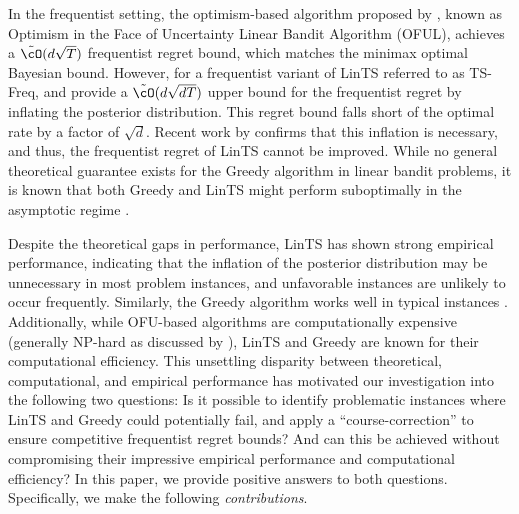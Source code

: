 In the frequentist setting, the optimism-based algorithm proposed by \cite{abbasi2011improved}, known as Optimism in the Face of Uncertainty Linear Bandit Algorithm (OFUL), achieves a $\tilde{\cO}(d\sqrt{T})$ frequentist regret bound, which matches the minimax optimal Bayesian bound. However, for a frequentist variant of LinTS referred to as TS-Freq, \cite{agrawal2013thompson} and \cite{abeille2017linear} provide a $\tilde{\cO}(d\sqrt{dT})$ upper bound for the frequentist regret by inflating the posterior distribution. This regret bound falls short of the optimal rate by a factor of $\sqrt{d}$. Recent work by \citet{hamidi2020frequentist} confirms that this inflation is necessary, and thus, the frequentist regret of LinTS cannot be improved. While no general theoretical guarantee exists for the Greedy algorithm in linear bandit problems, it is known that both Greedy and LinTS might perform suboptimally in the asymptotic regime \citep{lattimore2017end}.

Despite the theoretical gaps in performance, LinTS has shown strong empirical performance, indicating that the inflation of the posterior distribution may be unnecessary in most problem instances, and unfavorable instances are unlikely to occur frequently. Similarly, the Greedy algorithm works well in typical instances 
\citep{bietti2021contextual}. Additionally, while OFU-based algorithms are computationally expensive (generally NP-hard as discussed by \cite{dani2008stochastic,russo2014learning,agrawal2019recent}), LinTS and Greedy are known for their computational efficiency. This unsettling disparity between theoretical, computational, and empirical performance has motivated our investigation into the following two questions:  Is it possible to identify problematic instances where LinTS and Greedy could potentially fail, and apply a ``course-correction'' to ensure competitive frequentist regret bounds? And can this be achieved without compromising their impressive empirical performance and computational efficiency?
%
In this paper, we provide positive answers to both questions. Specifically, we make the following \emph{contributions}. 

